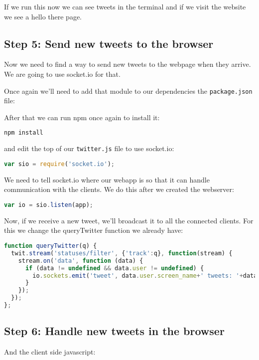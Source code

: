 \documentclass[a4paper]{report}
\begin{document}


\noindent If we run this now we can see tweets in the terminal and if we visit the website we see a hello there page.

\subsection*{Step 5: Send new tweets to the browser}

Now we need to find a way to send new tweets to the webpage when they arrive. We are going to use socket.io for that.

Once again we'll need to add that module to our dependencies the \texttt{package.json} file:



After that we can run npm once again to install it:
\begin{lstlisting}[language=bash]
npm install
\end{lstlisting}

\noindent and edit the top of our \texttt{twitter.js} file to use socket.io:

\begin{lstlisting}[language=JavaScript]
var sio = require('socket.io');
\end{lstlisting}

\noindent We need to tell socket.io where our webapp is so that it can handle communication with the clients. We do this after we created the webserver:

\begin{lstlisting}[language=JavaScript]
var io = sio.listen(app);
\end{lstlisting}

\noindent Now, if we receive a new tweet, we'll broadcast it to all the connected clients. For this we change the queryTwitter function we already have:

\begin{lstlisting}[language=JavaScript]
function queryTwitter(q) { 
  twit.stream('statuses/filter', {'track':q}, function(stream) {
    stream.on('data', function (data) {
      if (data != undefined && data.user != undefined) {
        io.sockets.emit('tweet', data.user.screen_name+' tweets: '+data.text);
      }
    });
  });
};
\end{lstlisting}

\subsection*{Step 6: Handle new tweets in the browser}

\noindent And the client side javascript:


\end{document}
